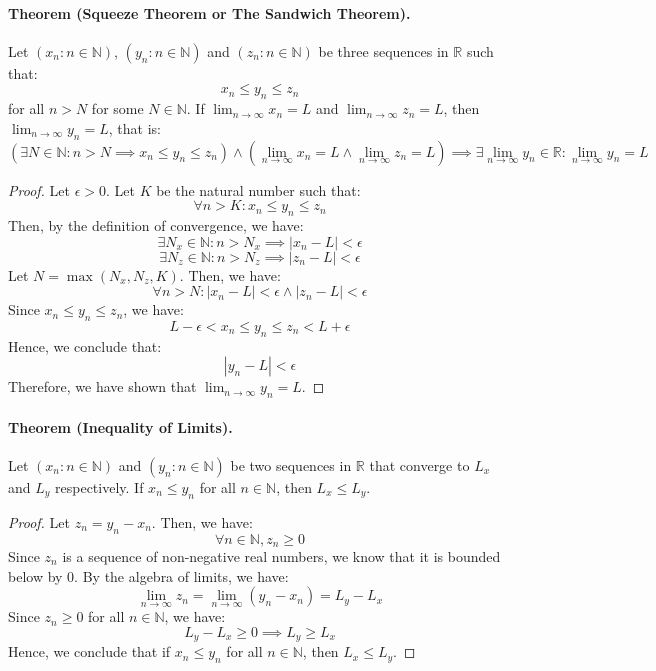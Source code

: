 \documentclass[openany]{book}
\numberwithin{equation}{section}
\begin{document}
\paragraph{Theorem (Squeeze Theorem or The Sandwich Theorem).}

    Let $(x_n : n \in \mathbb{N})$, $(y_n : n \in \mathbb{N})$ and $(z_n : n \in \mathbb{N})$ be three sequences in $\mathbb{R}$ such that:
    $$x_n \leq y_n \leq z_n$$
    for all $n > N$ for some $N \in \mathbb{N}$. If $\lim_{n \to \infty} x_n = L$ and $\lim_{n \to \infty} z_n = L$, then $\lim_{n \to \infty} y_n = L$, that is: 
    $$(\exists N \in \mathbb{N}: n > N \implies x_n \leq y_n \leq z_n) \wedge (\lim_{n \to \infty} x_n = L \wedge \lim_{n \to \infty} z_n = L) \implies \exists \lim_{n \to \infty} y_n \in \mathbb{R} : \lim_{n \to \infty} y_n = L$$
\par
\begin{proof}
    Let $\epsilon > 0$. Let $K$ be the natural number such that: 
    $$\forall n > K: x_n \leq y_n \leq z_n$$
    Then, by the definition of convergence, we have:
    $$\exists N_x \in \mathbb{N}: n > N_x \implies |x_n - L| < \epsilon$$
    $$\exists N_z \in \mathbb{N}: n > N_z \implies |z_n - L| < \epsilon$$
    Let $N = \max(N_x, N_z, K)$. Then, we have:
    $$\forall n > N: |x_n - L| < \epsilon \wedge |z_n - L| < \epsilon$$
    Since $x_n \leq y_n \leq z_n$, we have:
    $$L - \epsilon < x_n \leq y_n \leq z_n < L + \epsilon$$
    Hence, we conclude that:
    $$|y_n - L| < \epsilon$$
    Therefore, we have shown that $\lim_{n \to \infty} y_n = L$.
\end{proof}
\paragraph{Theorem (Inequality of Limits).}

    Let $(x_n : n \in \mathbb{N})$ and $(y_n : n \in \mathbb{N})$ be two sequences in $\mathbb{R}$ that converge to $L_x$ and $L_y$ respectively. If $x_n \leq y_n$ for all $n \in \mathbb{N}$, then $L_x \leq L_y$.
\par
\begin{proof}
    Let $z_n = y_n - x_n$. Then, we have:
    $$\forall n \in \mathbb{N}, z_n \geq 0$$
    Since $z_n$ is a sequence of non-negative real numbers, we know that it is bounded below by 0. By the algebra of limits, we have:
    $$\lim_{n \to \infty} z_n = \lim_{n \to \infty} (y_n - x_n) = L_y - L_x$$
    Since $z_n \geq 0$ for all $n \in \mathbb{N}$, we have:
    $$L_y - L_x \geq 0 \implies L_y \geq L_x$$
    Hence, we conclude that if $x_n \leq y_n$ for all $n \in \mathbb{N}$, then $L_x \leq L_y$.
\end{proof}
\end{document}
